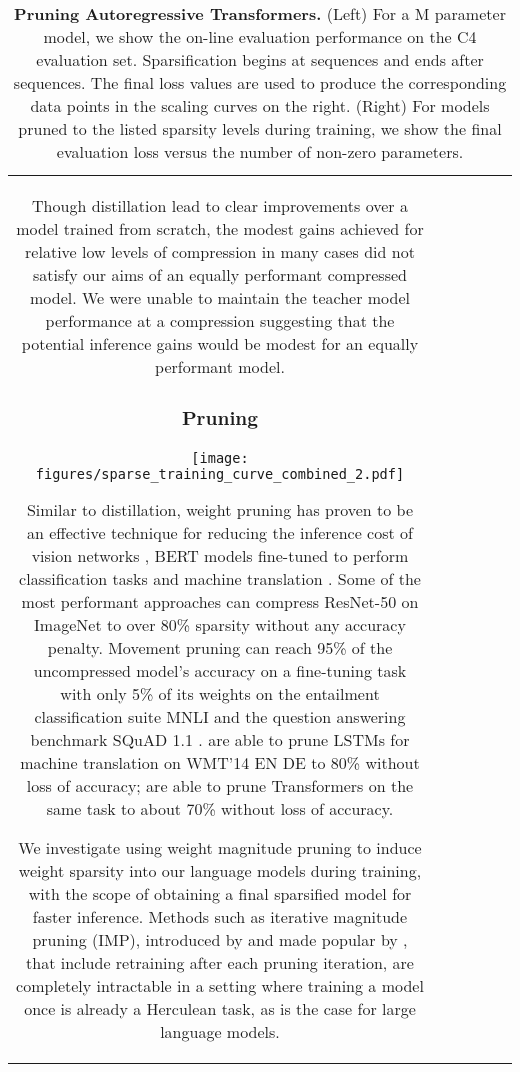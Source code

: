 \documentclass[11pt, a4paper, logo, internal, copyright, nonumbering]{deepmind}
\begin{document}
\begin{center}
\begin{longtable}{cclccc}
{Though distillation lead to clear improvements over a model trained from scratch, the modest gains achieved for relative low levels of compression in many cases did not satisfy our aims of an equally performant compressed model.
We were unable to maintain the teacher model performance at a  compression suggesting that the potential inference gains would be modest for an equally performant model.



\subsubsection{Pruning}
\label{app:pruning}
\begin{figure*}[t]
    \centering
    \texttt{[image: figures/sparse\_training\_curve\_combined\_2.pdf]}
    \caption{\textbf{Pruning Autoregressive Transformers.}
    (Left) For a M parameter model, we show the on-line evaluation performance on the C4 evaluation set. Sparsification begins at  sequences and ends after  sequences. The final loss values are used to produce the corresponding data points in the scaling curves on the right.
    (Right) For models pruned to the listed sparsity levels during training, we show the final evaluation loss versus the number of non-zero parameters. 
    }
    \label{fig:sparsity}
\end{figure*} 
Similar to distillation, weight pruning has proven to be an effective technique for reducing the inference cost of vision networks \citep{fastsparseconvnets, evci2020rigging, jayakumar2021top, stateofnnpruning}, BERT models fine-tuned to perform classification tasks \citep{sanh2020movement} and machine translation \citep{mtpruning, stateofsparsity}.
Some of the most performant approaches \citep{woodfisherprune, stateofnnpruning} can compress ResNet-50 on ImageNet \citep{deng2009imagenet} to over 80\% sparsity without any accuracy penalty. 
Movement pruning can reach 95\% of the uncompressed model's accuracy on a fine-tuning task with only 5\% of its weights on the entailment classification suite MNLI \citep{williams-etal-2018-broad} and the question answering benchmark SQuAD 1.1 \citep{rajpurkar2016squad}. 
\citet{mtpruning} are able to prune LSTMs for machine translation on WMT'14 EN  DE to 80\% without loss of accuracy; \citet{stateofsparsity} are able to prune Transformers on the same task to about 70\% without loss of accuracy.


We investigate using weight magnitude pruning \citep{exploringsparsityrnns, zhu2017prune} to induce weight sparsity into our language models during training, with the scope of obtaining a final sparsified model for faster inference. Methods such as iterative magnitude pruning (IMP), introduced by \citet{han2015deep} and made popular by \citet{frankle2018lottery}, that include retraining after each pruning iteration, are completely intractable in a setting where training a model once is already a Herculean task, as is the case for large language models.

}
\end{longtable}
\end{center}
\end{document}
